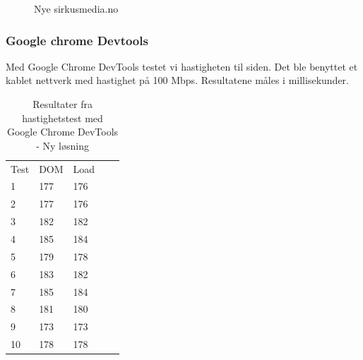 \begin{figure}[H]
    \begin{center}
        \label{fig:analysis-new-website}
        \caption{Nye sirkusmedia.no}
    \end{center}
\end{figure}

\subsubsection{Google chrome Devtools}
Med Google Chrome DevTools testet vi hastigheten til siden. Det ble benyttet et kablet nettverk med hastighet på 100 Mbps. Resultatene måles i millisekunder.

\begin{table}[H]
\begin{center}
\begin{tabular}{lllll}
Test & DOM & Load &  &  \\
1 & 177 & 176 &  &  \\
2 & 177 & 176 &  &  \\
3 & 182 & 182 &  &  \\
4 & 185 & 184 &  &  \\
5 & 179 & 178 &  &  \\
6 & 183 & 182 &  &  \\
7 & 185 & 184 &  &  \\
8 & 181 & 180 &  &  \\
9 & 173 & 173 &  &  \\
10 & 178 & 178 &  &  \\
\end{tabular}
\end{center}
\caption{\label{tab:table-analysis-new-website}Resultater fra hastighetstest med Google Chrome DevTools - Ny løsning}
\end{table}

